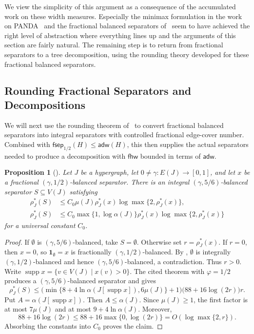 \documentclass[11pt,letterpaper]{article}
\newtheorem{proposition}[proposition]{Proposition}
\theoremstyle{definition}
\theoremstyle{remark}
\newcommand{\fhw}{\mathsf{fhw}}
\newcommand{\adw}{\mathsf{adw}}
\newcommand{\fsep}{\mathsf{fsep}}
\newcommand{\supp}{\operatorname{supp}}
\providecommand{\adw}{\operatorname{adw}}
\providecommand{\fhw}{\operatorname{fhw}}
\begin{document}
We view the simplicity of this argument as a consequence of the accumulated work on these width measures. Especially the minimax formulation in the work on PANDA~\cite{KhamisNgoSuciu2025PANDA} and the fractional balanced separators of~\cite{KorchemnaEtAl2024} seem to have achieved the right level of abstraction where everything lines up and the arguments of this section are fairly natural. The remaining step is to return from fractional separators to a tree decomposition, using the rounding theory developed for these fractional balanced separators.

\subsection{Rounding Fractional Separators and Decompositions}
\label{sec:rounding}

We will next use the rounding theorem of~\cite{KorchemnaEtAl2024} to convert fractional balanced separators into integral separators with controlled fractional edge-cover number. Combined with $\fsep_{1/2}(H)\le\adw(H)$, this then supplies the actual separators needed to produce a decomposition with $\fhw$ bounded in terms of $\adw$.

\begin{proposition}[{\cite[Theorem~5.6]{KorchemnaEtAl2024}}]
\label{thm:rounding}
Let $J$ be a hypergraph, let $0\ne\gamma:E(J)\to[0,1]$, and let $x$ be a
fractional $(\gamma,1/2)$-balanced separator. There is an integral
$(\gamma,5/6)$-balanced separator $S\subseteq V(J)$ satisfying
\[
 \begin{aligned}
 \rho_J^*(S)&\le C_0\mu(J)\rho_J^*(x)\log\max\{2,\rho_J^*(x)\},\\
 \rho_J^*(S)&\le C_0\max\{1,\log\alpha(J)\}\rho_J^*(x)\log\max\{2,\rho_J^*(x)\}
 \end{aligned}
\]
for a universal constant $C_0$.
\end{proposition}

\begin{proof}
If $\emptyset$ is $(\gamma,5/6)$-balanced, take $S=\emptyset$.
Otherwise set $r=\rho_J^*(x)$. If $r=0$, then $x=0$, so
$\mathbf 1_\emptyset=x$ is fractionally $(\gamma,1/2)$-balanced.
By , $\emptyset$ is integrally
$(\gamma,1/2)$-balanced and hence $(\gamma,5/6)$-balanced, a contradiction.
Thus $r>0$.
Write $\supp x=\{v\in V(J)\mid x(v)>0\}$.
The cited theorem with $\varphi=1/2$ produces a $(\gamma,5/6)$-balanced
separator and gives
\[
 \rho_J^*(S)
 \le
 \bigl(\min\{8+4\ln\alpha(J[\supp x]),6\mu(J)\}+1\bigr)
 \bigl(88+16\log(2r)\bigr)r.
\]
Put $A=\alpha(J[\supp x])$. Then $A\le\alpha(J)$. Since $\mu(J)\ge1$,
the first factor is at most $7\mu(J)$ and at most
$9+4\ln\alpha(J)$. Moreover,
\[
 88+16\log(2r)
 \le 88+16\max\{0,\log(2r)\}
 =O(\log\max\{2,r\}).
\]
Absorbing the constants into $C_0$ proves the claim.
\end{proof}
\end{document}
